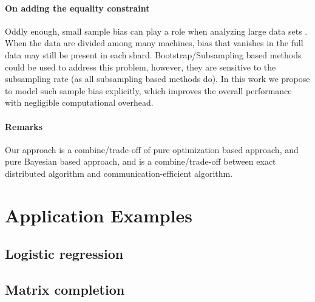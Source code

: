 \documentclass{article}
\newcommand{\1}[0]{\ensuremath{\boldsymbol{1}}\xspace}
\begin{document}
\paragraph{On adding the equality constraint} Oddly enough, small sample bias can play a role when analyzing large data sets \cite{YZhang2012}. When the data are divided among many machines, bias that vanishes in the full data may still be present in each shard. Bootstrap/Subsampling based methods could be used to address this problem, however, they are sensitive to the subsampling rate (as all subsampling based methods do). In this work we propose to model such sample bias explicitly, which improves the overall performance with negligible computational overhead.
\paragraph{Remarks} Our approach is a combine/trade-off of pure optimization based approach, and pure Bayesian based approach, and is a combine/trade-off between exact distributed algorithm and communication-efficient algorithm.



\section{Application Examples}
\subsection{Logistic regression}

\subsection{Matrix completion}





\end{document}

